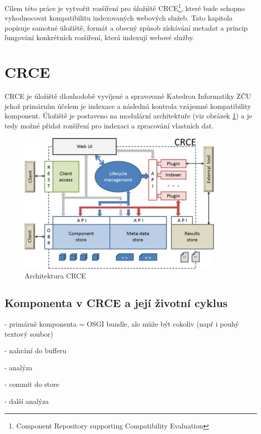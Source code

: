 \documentclass[czech,DP]{thesiskiv}
\begin{document}
Cílem této práce je vytvořit rozšíření pro úložiště CRCE\footnote{Component Repository supporting Compatibility Evaluation}, které bude schopno vyhodnocovat kompatibilitu indexovaných webových služeb. Tato kapitola popisuje samotné úložiště, formát a obecný způsob získávání metadat a princip fungování konkrétních rozšíření, která indexují webové služby.

\section{CRCE}


CRCE je úložiště dlouhodobě vyvíjené a spravované Katedrou Informatiky ZČU jehož primárním účelem je indexace a následná kontrola vzájemné kompatibility komponent. Úložiště je postaveno na modulární architektuře (viz obrázek \ref{fig:crce-arch}) a je tedy možné přidat rozšíření pro indexaci a zpracování vlastních dat.

\begin{figure}[h]
	\centering
	\includegraphics[width=10cm]{crce-arch.jpg}
	\caption{Architektura CRCE}
	\label{fig:crce-arch}
\end{figure} 

\subsection{Komponenta v CRCE a její životní cyklus}

 - primárně komponenta = OSGI bundle, ale může být cokoliv (např i pouhý textový soubor)

 - nahrání do bufferu
 
 - analýza
 
 - commit do store
 
 - další analýza
 
\end{document}
